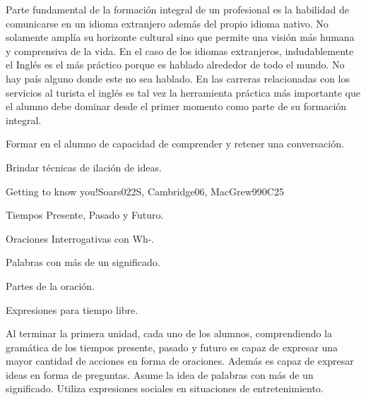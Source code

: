 \begin{syllabus}


\begin{justification}
Parte fundamental de la formación integral de un profesional es la habilidad de comunicarse en un idioma extranjero además del propio idioma nativo. No solamente amplía su horizonte cultural sino que permite una visión más humana y comprensiva de la vida. En el caso de los idiomas extranjeros, indudablemente el Inglés es el 
más práctico porque es hablado alrededor de todo el mundo. No hay país alguno donde este no sea hablado. En las carreras relacionadas con los servicios al turista el inglés es tal vez la herramienta práctica más importante que el alumno debe dominar desde el primer momento como parte de su formación integral.
\end{justification}

\begin{goals}
\item Formar en el alumno de capacidad de comprender y retener una conversación.
\item Brindar técnicas de ilación de ideas.
\end{goals}

\begin{outcomes}
\item {}
\end{outcomes}

\begin{competences}
\item {}
\end{competences}

\begin{unit}{Getting to know you!}{}{Soars022S, Cambridge06, MacGrew99}{0}{C25}
   \begin{topics}
      \item Tiempos Presente, Pasado y Futuro.
      \item Oraciones Interrogativas con Wh-.
      \item Palabras con más de un significado.
      \item Partes de la oración.
      \item Expresiones para tiempo libre.
   \end{topics}

   \begin{learningoutcomes}
      \item Al terminar la primera unidad, cada uno de los alumnos, comprendiendo la gramática de los tiempos presente, pasado y futuro es capaz de expresar una mayor cantidad de acciones en forma de oraciones.  Además es capaz de expresar ideas en forma de preguntas.  Asume la idea de palabras con más de un significado. Utiliza expresiones sociales en situaciones de entretenimiento. 
   \end{learningoutcomes}
\end{unit}


\end{syllabus}
